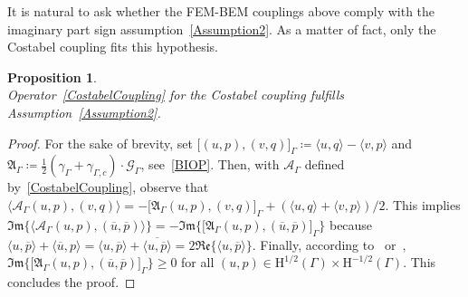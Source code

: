 \documentclass[a4paper,11pt]{article}
\newcommand{\mH}{\mathrm{H}}
\newcommand{\lbr}{\lbrack}
\newcommand{\rbr}{\rbrack}
\renewcommand{\Re}{\mathfrak{Re}} %
\renewcommand{\Im}{\mathfrak{Im}} %
\newtheorem{prop}[defn]{Proposition}
\begin{document}
It is natural to ask whether the FEM-BEM couplings above comply with the imaginary part sign assumption~\eqref{Assumption2}. As a matter of fact, only
the Costabel coupling fits this hypothesis.
\begin{prop}\label{prop:costabel_sign_assumption}\quad\\
  Operator~\eqref{CostabelCoupling} for the Costabel coupling 
  fulfills Assumption~\eqref{Assumption2}.
\end{prop}
\begin{proof}
For the sake of brevity, set $\lbr(u,p),(v,q)\rbr_{\Gamma}\coloneq \langle u,q\rangle-\langle
v,p\rangle$ and $\mathfrak{A}_{\Gamma}\coloneq
\frac{1}{2}(\gamma_{\Gamma}+\gamma_{\Gamma,c})\cdot\mathcal{G}_{\Gamma}$,
see~\eqref{BIOP}.
Then, with $\mathcal{A}_{\Gamma}$ defined by~\eqref{CostabelCoupling},
observe that $\langle \mathcal{A}_{\Gamma}(u,p),(v,q)\rangle =
-\lbr \mathfrak{A}_{\Gamma}(u,p),(v,q)\rbr_{\Gamma} +
(\langle u,q\rangle+\langle v,p\rangle)/2$. This implies 
$\Im\{\langle \mathcal{A}_{\Gamma}(u,p),(\overline{u},\overline{p})\rangle\} =
-\Im\{\lbr \mathfrak{A}_{\Gamma}(u,p),(\overline{u},\overline{p})\rbr_{\Gamma}\}$ because $\langle u, \overline{p} \rangle + \langle \overline{u}, p \rangle = \langle u, \overline{p} \rangle + \overline{\langle u, \overline{p} \rangle} = 2 \Re \{ \langle u, \overline{p} \rangle\}$. 
Finally, according to~\cite[Proposition A.2]{MR4779883} or~\cite[Lemma 3.2.1]{MR1822275},
$\Im\{\lbr \mathfrak{A}_{\Gamma}(u,p),(\overline{u},\overline{p})
\rbr_{\Gamma}\}\geq 0$ for all $(u,p)\in \mH^{1/2}(\Gamma)\times \mH^{-1/2}(\Gamma)$.
This concludes the proof. 
\end{proof}
\end{document}
